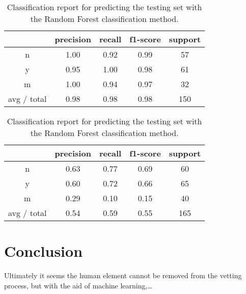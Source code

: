 \documentclass[11pt]{article}
\begin{document}
\begin{table}
  \centering
  \begin{tabular}[!htbp]{c|c c c c}
                & precision &recall &f1-score &support \\ \hline
    n           & 1.00      &0.92   &0.99     &57      \\
    y           & 0.95      &1.00   &0.98     &61      \\
    m           & 1.00      &0.94   &0.97     &32      \\ \hline
    avg / total & 0.98      &0.98   &0.98     &150     \\
  \end{tabular}
  \caption{Reconstructing the training set (150 flares total) with
    Random Forest classification method.}

  \begin{tabular}[!htbp]{c|c c c c}
                & precision &recall &f1-score &support \\ \hline
    n           & 0.63      &0.77   &0.69     &60      \\
    y           & 0.60      &0.72   &0.66     &65      \\
    m           & 0.29      &0.10   &0.15     &40      \\ \hline
    avg / total & 0.54      &0.59   &0.55     &165     \\
  \end{tabular}
  \caption{Classification report for predicting the testing set
    with the Random Forest classification method.}
\end{table}

\section{Conclusion}
\label{sec:conc}
Ultimately it seems the human element cannot be removed from the
vetting process, but with the aid of machine learning,\ldots
\end{document}
